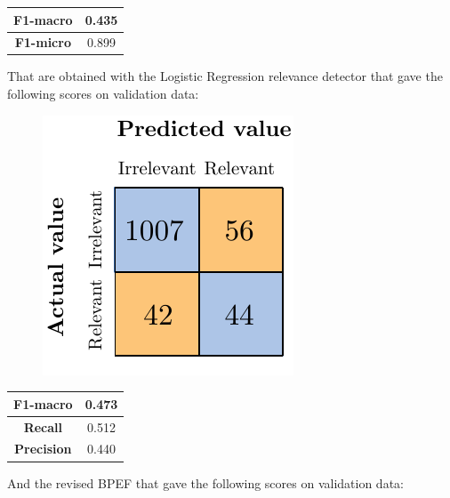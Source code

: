 \begin{center}
	\begin{tabular}{ | c | c | } 
		\hline
		\textbf{F1-macro} & 0.435 \\
		\hline
		\textbf{F1-micro} & 0.899 \\ 
		\hline
	\end{tabular}
\end{center}

That are obtained with the Logistic Regression relevance detector that gave the following scores on validation data:

\begin{figure}[H]
	\centering
	\includegraphics[scale=1]{figures/conf_matrices/ita_support/ita_rel_support_logreg_afs.pdf}
	\label{fig:ita_rel_support_logreg_afs}
\end{figure}

\begin{center}
	\begin{tabular}{ | c | c | } 
		\hline
		\textbf{F1-macro} & 0.473 \\
		\hline
		\textbf{Recall} & 0.512 \\ 
		\hline
		\textbf{Precision} & 0.440 \\ 
		\hline
	\end{tabular}
\end{center}

And the revised BPEF that gave the following scores on validation data:

